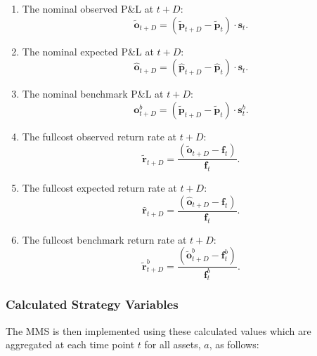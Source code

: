 \documentclass[a4paper,11pt,oneside]{article}
\theoremstyle{plain}
\theoremstyle{definition}
\begin{document}
\begin{enumerate}
		
		\item The nominal observed P\&L at $t+D$:
		\begin{equation}
			\mathbf{\tilde{o}}_{t + D} = \left( \mathbf{\tilde{p}}_{t+D} - \mathbf{\tilde{p}}_t \right) \cdot \mathbf{s}_t .
		\end{equation}	
		\item The nominal expected P\&L at $t+D$:
		\begin{equation}
		\mathbf{\hat{o}}_{t + D} = \left( \mathbf{\hat{p}}_{t+D} - \mathbf{\hat{p}}_t \right ) \cdot \mathbf{s}_t .
		\end{equation}
		\item The nominal benchmark P\&L at $t+D$:
		\begin{equation}
			\mathbf{o}^b_{t + D} = \left( \mathbf{\tilde{p}}_{t+D} - \mathbf{\tilde{p}}_t \right) \cdot \mathbf{s}^b_{t} .
		\end{equation}
		
		
		\item The fullcost observed return rate at $t+D$:
		\begin{equation}
		\mathbf{\tilde{r}}_{t + D} = \frac{\left( \mathbf{\tilde{o}}_{t+D} - \mathbf{f}_t \right) }
		{\mathbf{f}_t} .
		\end{equation}
		\item The fullcost expected return rate at $t+D$:
		\begin{equation}
		\mathbf{\hat{r}}_{t + D} = \frac{\left( \mathbf{\hat{o}}_{t+D} - \mathbf{f}_t \right) }
		{\mathbf{f}_t} .
		\end{equation}
		\item The fullcost benchmark return rate at $t+D$:
		\begin{equation}
		\mathbf{\tilde{r}}^b_{t + D} = \frac{\left( \mathbf{\tilde{o}}^b_{t+D} - \mathbf{f}^b_t \right) }
		{\mathbf{f}^b_t} .
		\end{equation}	
		
		
	\end{enumerate}
	\hfill\break
	
	
	\subsubsection{Calculated Strategy Variables} The MMS  is then implemented using these calculated values which are aggregated at each time point $t$ for all assets, $a$, as follows:
	
\end{document}
